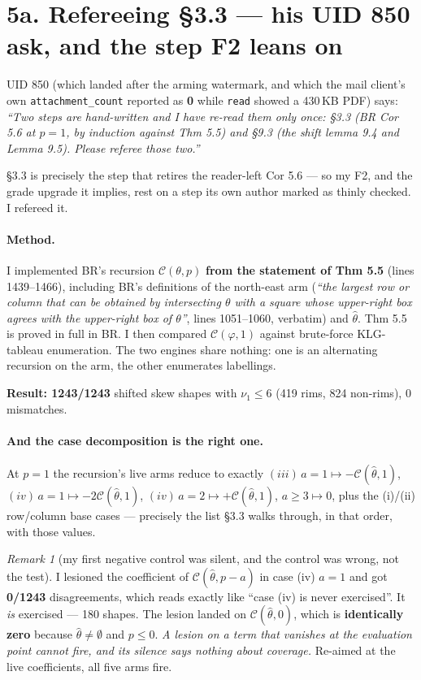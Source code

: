 \documentclass[11pt,a4paper]{article}
\theoremstyle{remark}
\newtheorem*{remark}{Remark}
\newcommand{\wh}[1]{\widehat{#1}}
\begin{document}
\section*{5a. Refereeing \S3.3 --- his UID 850 ask, and the step F2 leans on}

UID 850 (which landed after the arming watermark, and which the mail client's own
\texttt{attachment\_count} reported as \textbf{0} while \texttt{read} showed a 430\,KB PDF) says:
\emph{``Two steps are hand-written and I have re-read them only once: \S3.3 (BR Cor 5.6 at
$p=1$, by induction against Thm 5.5) and \S9.3 (the shift lemma 9.4 and Lemma 9.5). Please
referee those two.''}

\S3.3 is precisely the step that retires the reader-left Cor 5.6 --- so my F2, and the grade
upgrade it implies, rest on a step its own author marked as thinly checked. I refereed it.

\paragraph{Method.} I implemented BR's recursion $\mathcal C(\theta,p)$ \textbf{from the
statement of Thm 5.5} (lines 1439--1466), including BR's definitions of the north-east arm
(\emph{``the largest row or column that can be obtained by intersecting $\theta$ with a square
whose upper-right box agrees with the upper-right box of $\theta$''}, lines 1051--1060, verbatim)
and $\wh\theta$. Thm 5.5 is proved in full in BR. I then compared $\mathcal C(\varphi,1)$ against
brute-force KLG-tableau enumeration. The two engines share nothing: one is an alternating
recursion on the arm, the other enumerates labellings.

\textbf{Result: 1243/1243} shifted skew shapes with $\nu_1\le6$ (419 rims, 824 non-rims), 0
mismatches.

\paragraph{And the case decomposition is the right one.} At $p=1$ the recursion's live arms
reduce to exactly $(iii)\,a{=}1\mapsto-\mathcal C(\wh\theta,1)$,
$(iv)\,a{=}1\mapsto-2\mathcal C(\wh\theta,1)$, $(iv)\,a{=}2\mapsto+\mathcal C(\wh\theta,1)$,
$a\ge3\mapsto0$, plus the (i)/(ii) row/column base cases --- precisely the list \S3.3 walks
through, in that order, with those values.

\begin{remark}[my first negative control was silent, and the control was wrong, not the test]
I lesioned the coefficient of $\mathcal C(\wh\theta,p-a)$ in case (iv) $a{=}1$ and got
\textbf{0/1243} disagreements, which reads exactly like ``case (iv) is never exercised''. It
\emph{is} exercised --- 180 shapes. The lesion landed on $\mathcal C(\wh\theta,0)$, which is
\textbf{identically zero} because $\wh\theta\neq\emptyset$ and $p\le0$. \emph{A lesion on a term
that vanishes at the evaluation point cannot fire, and its silence says nothing about coverage.}
Re-aimed at the live coefficients, all five arms fire.
\end{remark}
\end{document}
